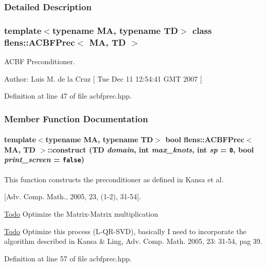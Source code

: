 \subsubsection{Detailed Description}
\subsubsection*{template$<$typename MA, typename TD$>$ class flens::ACBFPrec$<$ MA, TD $>$}

ACBF Preconditioner. 

\begin{Desc}
\item[Author:]Luis M. de la Cruz \mbox{[} Tue Dec 11 12:54:41 GMT 2007 \mbox{]} \end{Desc}


Definition at line 47 of file acbfprec.hpp.

\subsubsection{Member Function Documentation}
\hypertarget{classflens_1_1ACBFPrec_d6f568d64787268a5fb16eed6692f418}{
\paragraph[{construct}]{\setlength{\rightskip}{0pt plus 5cm}template$<$typename MA, typename TD$>$ bool {\bf flens::ACBFPrec}$<$ MA, TD $>$::construct (TD {\em domain}, \/  int {\em max\_\-knots}, \/  int {\em sp} = {\tt 0}, \/  bool {\em print\_\-screen} = {\tt false})}\hfill}
\label{classflens_1_1ACBFPrec_d6f568d64787268a5fb16eed6692f418}


This function constructs the preconditioner as defined in Kansa et al. 

\mbox{[}Adv. Comp. Math., 2005, 23, (1-2), 31-54\mbox{]}. 

\begin{Desc}
\item[\hyperlink{todo__todo000004}{Todo}]Optimize the Matrix-Matrix multiplication \end{Desc}


\begin{Desc}
\item[\hyperlink{todo__todo000004}{Todo}]Optimize this process (L-QR-SVD), basically I need to incorporate the algorithm described in Kansa \& Ling, Adv. Comp. Math. 2005, 23: 31-54, pag 39. \end{Desc}


Definition at line 57 of file acbfprec.hpp.